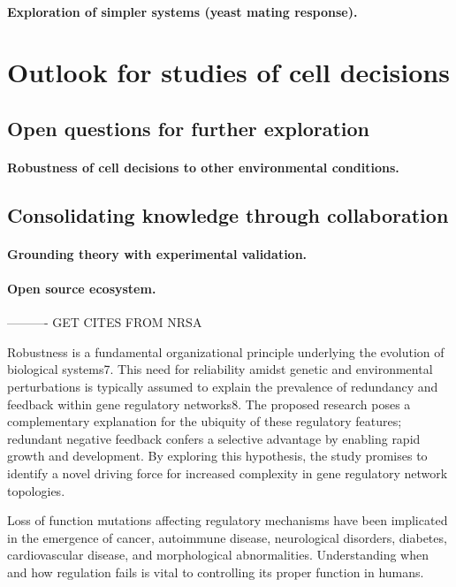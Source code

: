 		\paragraph{Exploration of simpler systems (yeast mating response).}
		
\section{Outlook for studies of cell decisions}

	\subsection{Open questions for further exploration}
		\paragraph{Robustness of cell decisions to other environmental conditions.}	
					
	\subsection{Consolidating knowledge through collaboration}
	
		\paragraph{Grounding theory with experimental validation.}		
		\paragraph{Open source ecosystem.}




---------- GET CITES FROM NRSA

Robustness is a fundamental organizational principle underlying the evolution of biological systems7. This need for reliability amidst genetic and environmental perturbations is typically assumed to explain the prevalence of redundancy and feedback within gene regulatory networks8. The proposed research poses a complementary explanation for the ubiquity of these regulatory features; redundant negative feedback confers a selective advantage by enabling rapid growth and development. By exploring this hypothesis, the study promises to identify a novel driving force for increased complexity in gene regulatory network topologies. 



Loss of function mutations affecting regulatory mechanisms have been implicated in the emergence of cancer, autoimmune disease, neurological disorders, diabetes, cardiovascular disease, and morphological abnormalities. Understanding when and how regulation fails is vital to controlling its proper function in humans.

